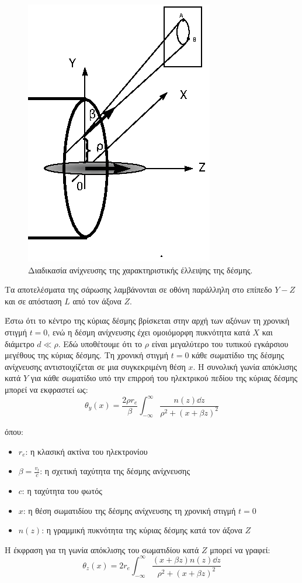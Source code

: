 \begin{figure}[tph]
	\includegraphics[width=0.6\linewidth]{figures/Logatchov1999-EBS}
	\centering
	\caption{Διαδικασία ανίχνευσης της χαρακτηριστικής έλλειψης της δέσμης.}
	\label{fig:ellipse-EBS}
\end{figure}

Τα αποτελέσματα της σάρωσης λαμβάνονται σε οθόνη παράλληλη στο επίπεδο $Y-Z$ και σε απόσταση $L$ από τον άξονα $Z$.

Έστω ότι το κέντρο της κύριας δέσμης βρίσκεται στην αρχή των αξόνων τη χρονική στιγμή $t = 0$, ενώ η δέσμη ανίχνευσης έχει ομοιόμορφη πυκνότητα κατά $X$ και διάμετρο $d \ll \rho$.
Εδώ υποθέτουμε ότι το $\rho$ είναι μεγαλύτερο του τυπικού εγκάρσιου μεγέθους της κύριας δέσμης.
Τη χρονική στιγμή $t = 0$ κάθε  σωματίδιο της δέσμης ανίχνευσης αντιστοιχίζεται σε μια συγκεκριμένη θέση $x$.
Η συνολική γωνία απόκλισης κατά $Y$ για κάθε σωματίδιο υπό την επιρροή του ηλεκτρικού πεδίου της κύριας δέσμης μπορεί να εκφραστεί ως\cite{Logatchov1999}:
\begin{equation} \label{eq:thetayLogatchov1999}
\theta_y (x) = \frac{2 \rho r_e}{\beta} \int_{-\infty}^{\infty}\frac{n(z) \dd z}{\rho^2 + \left(x+\beta z \right) ^2}
\end{equation}

όπου:
\begin{itemize}
\item $r_e$: η κλασική ακτίνα του ηλεκτρονίου
\item $\beta =\frac{v_t}{c}$: η σχετική ταχύτητα της δέσμης ανίχνευσης
\item $c$: η ταχύτητα του φωτός
\item $x$: η θέση σωματιδίου της δέσμης ανίχνευσης τη χρονική στιγμή $t=0$
\item $n(z)$: η γραμμική πυκνότητα της κύριας δέσμης κατά τον άξονα $Z$
\end{itemize} 

Η έκφραση για τη γωνία απόκλισης του σωματιδίου κατά $Z$ μπορεί να γραφεί\cite{Logatchov1999}:
\begin{equation} \label{eq:thetazLogatchov1999}
\theta_z(x) = 2 r_e \int_{-\infty}^{\infty}\frac{(x+\beta z)n(z) \dd z}{\rho^2 + \left(x+\beta z \right) ^2}
\end{equation}